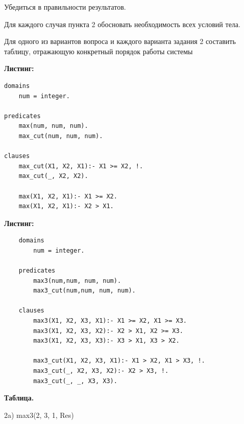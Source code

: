 \documentclass[12pt, a4paper]{extarticle}
\begin{document}
Убедиться в правильности результатов.

Для каждого случая пункта 2 обосновать необходимость всех условий тела. 

Для одного из вариантов вопроса и каждого варианта задания 2 составить таблицу, отражающую конкретный порядок работы системы

\hfill

\textbf{Листинг:}

\begin{lstlisting}
domains
	num = integer.

predicates
	max(num, num, num).
	max_cut(num, num, num).

clauses
	max_cut(X1, X2, X1):- X1 >= X2, !.
	max_cut(_, X2, X2).	
	
	max(X1, X2, X1):- X1 >= X2.
	max(X1, X2, X1):- X2 > X1.
\end{lstlisting} \par
\newpage
\textbf{Листинг:}\par

\begin{lstlisting}
	domains
		num = integer.
	
	predicates	
		max3(num,num, num, num).
		max3_cut(num,num, num, num).
	
	clauses
		max3(X1, X2, X3, X1):- X1 >= X2, X1 >= X3.
		max3(X1, X2, X3, X2):- X2 > X1, X2 >= X3.
		max3(X1, X2, X3, X3):- X3 > X1, X3 > X2.
		
		max3_cut(X1, X2, X3, X1):- X1 > X2, X1 > X3, !.
		max3_cut(_, X2, X3, X2):- X2 > X3, !.
		max3_cut(_, _, X3, X3).
\end{lstlisting}
\newpage
\textbf{Таблица. }\par
2a) max3(2, 3, 1, Res)\par
\end{document}
